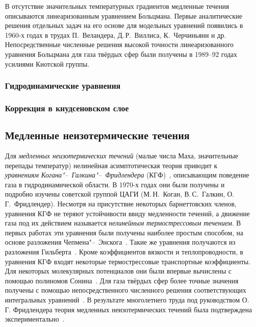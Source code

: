 В отсутствие значительных температурных градиентов медленные течения описываются
линеаризованным уравнением Больцмана. Первые аналитические решения отдельных задач на его основе
для модельных уравнений появились в 1960-х годах в трудах П.~Веландера, Д.\,Р.~Виллиса, К.~Черчиньяни и др.
Непосредственные численные решения высокой точности линеаризованного уравнения Больцмана
для газа твёрдых сфер были получены в 1989--92 годах усилиями Киотской группы.

\subsubsection{Гидродинамические уравнения}
\subsubsection{Коррекция в кнудсеновском слое}


\subsection{Медленные неизотермические течения}

Для \emph{медленных неизотермических течений} (малые числа Маха, значительные перепады температур)
нелинейная асимптотическая теория приводит к \emph{уравнениям Когана"--~Галкина"--~Фридлендера} (КГФ)~\cite{Kogan1976},
описывающим поведение газа в гидродинамической области.
В 1970-х годах они были получены и подробно изучены советской группой ЦАГИ
(М.\,Н.~Коган, В.\,С.~Галкин, О.\,Г.~Фридлендер).
Несмотря на присутствие некоторых барнеттовских членов,
уравнения КГФ не теряют устойчивости ввиду медленности течений,
а движение газа под их действием называется \emph{нелинейным термострессовым течением}.
В первых работах эти уравнения были получены наиболее простым способом,
на основе разложения Чепмена"--~Энскога~\cite{Kogan1970, Kogan1971}.
Такие же уравнения получаются из разложения Гильберта~\cite{Galkin1974}.
Кроме коэффициентов вязкости и теплопроводности, в уравнения КГФ входят некоторые
термострессовые транспортные коэффициенты. Для некоторых молекулярных потенциалов они
были впервые вычислены с помощью полиномов Сонина~\cite{Burnett1935, Chapman1960}.
Для газа твёрдых сфер более точные значения получены с помощью
непосредственного численного решения соответствующих интегральных уравнений~\cite{Sone1996}.
В результате многолетнего труда под руководством О.\,Г. Фридлендера теория медленных неизотермических течений
была подтверждена экспериментально~\cite{Friedlander1997, Friedlander2003}.

